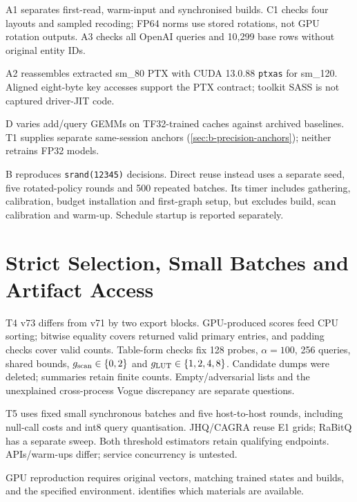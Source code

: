 A1 separates first-read, warm-input and synchronised builds. C1 checks four layouts and sampled recoding; FP64 norms use stored rotations, not GPU rotation outputs. A3 checks all OpenAI queries and 10,299 base rows without original entity IDs.

A2 reassembles extracted sm\_80 PTX with CUDA 13.0.88 \texttt{ptxas} for sm\_120. Aligned eight-byte key accesses support the PTX contract; toolkit SASS is not captured driver-JIT code.

D varies add/query GEMMs on TF32-trained caches against archived baselines. T1 supplies separate same-session anchors (\cref{sec:b-precision-anchors}); neither retrains FP32 models.

B reproduces \texttt{srand(12345)} decisions. Direct reuse instead uses a separate seed, five rotated-policy rounds and 500 repeated batches. Its timer includes gathering, calibration, budget installation and first-graph setup, but excludes build, scan calibration and warm-up. Schedule startup is reported separately.

\section{Strict Selection, Small Batches and Artifact Access}
\label{sec:a-t4-t5}

T4 v73 differs from v71 by two export blocks. GPU-produced scores feed CPU sorting; bitwise equality covers returned valid primary entries, and padding checks cover valid counts. Table-form checks fix 128 probes, $\alpha=100$, 256 queries, shared bounds, $g_{\mathrm{scan}}\in\{0,2\}$ and $g_{\mathrm{LUT}}\in\{1,2,4,8\}$. Candidate dumps were deleted; summaries retain finite counts. Empty/adversarial lists and the unexplained cross-process Vogue discrepancy are separate questions.

T5 uses fixed small synchronous batches and five host-to-host rounds, including null-call costs and int8 query quantisation. JHQ/CAGRA reuse E1 grids; RaBitQ has a separate sweep. Both threshold estimators retain qualifying endpoints. APIs/warm-ups differ; service concurrency is untested.

GPU reproduction requires original vectors, matching trained states and
builds, and the specified environment.  identifies
which materials are available.
